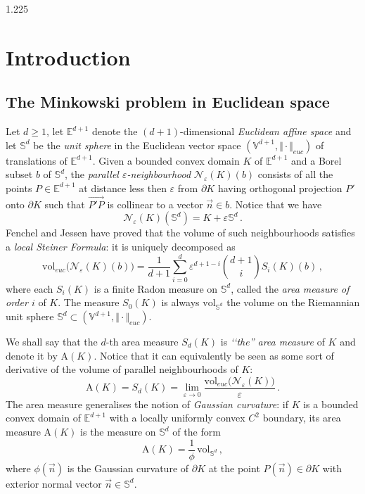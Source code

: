 \documentclass[reqno, a4paper]{amsart}
\numberwithin{equation}{section}
\numberwithin{figure}{section}
\theoremstyle{definition}
\theoremstyle{remark}
\newcommand{\V}{\mathbb{V}} %
\newcommand{\E}{\mathbb{E}} %
\newcommand{\Sph}{\mathbb{S}} %
\newcommand{\vol}{\mathrm{vol}} %
\newcommand{\Area}{\mathrm{A}} %
\newcommand{\bp}[1]{{\bigl( {#1} \bigr)}} %
\begin{document}
\begin{spacing}{1.225}

\section*{Introduction}

\subsection*{The Minkowski problem in Euclidean space}

Let $d \geq 1$, let $\E^{d+1}$ denote the $(d+1)$-dimensional \emph{Euclidean affine space} and let $\Sph^d$ be the \emph{unit sphere} in the Euclidean vector space $(\V^{d+1}, \Vert\cdot\Vert_{euc})$ of translations of $\E^{d+1}$. Given a bounded convex domain $K$ of $\E^{d+1}$ and  a Borel subset $b$ of $\Sph^d$, the \emph{parallel $\varepsilon$-neighbourhood} $\mathcal{N}_\varepsilon(K)(b)$ consists of all the points $P \in \E^{d+1}$ at distance less then $\varepsilon$ from $\partial K$ having orthogonal projection $P'$ onto $\partial K$ such that $\overrightarrow{P'P}$ is collinear to a vector $\vec{n} \in b$. Notice that we have 
\begin{equation*}
\mathcal{N}_\varepsilon(K)(\Sph^{d}) = K +\varepsilon \Sph^{d} \, .
\end{equation*}
Fenchel and Jessen have proved \cite{Fenchel_Jessen_38} that the volume of such neighbourhoods satisfies a \emph{local Steiner Formula}: it is uniquely decomposed as
\begin{equation*}
\vol_{euc}\bp{\mathcal{N}_\varepsilon(K)(b)} = \frac{1}{d+1}\sum_{i=0}^{d}\varepsilon^{d+1-i} \binom{d+1}{i} S_i(K) (b)\, , 
\end{equation*}
where each $S_i(K)$ is a finite Radon measure on $\Sph^d$, called the \emph{area measure of order $i$} of $K$. The measure $S_0(K)$ is always $\vol_{\Sph^d}$ the volume on the Riemannian unit sphere $\Sph^d \subset (\V^{d+1}, \Vert\cdot\Vert_{euc})$.

We shall say that the $d$-th area measure $S_d(K)$ is \emph{‘‘the'' area measure} of $K$ and denote it by $\Area(K)$. Notice that it can equivalently be seen as some sort of derivative of the volume of parallel neighbourhoods of $K$:
\begin{equation*}
    \Area(K) = S_d(K) = \lim_{\varepsilon \to 0} \frac{\vol_{euc}\bp{\mathcal{N}_\varepsilon(K)}}{\varepsilon} \, .
\end{equation*}
The area measure generalises the notion of \emph{Gaussian curvature}: if $K$ is a bounded convex domain of $\E^{d+1}$ with a locally uniformly convex $C^2$ boundary, its area measure $\Area(K)$ is the measure on $\Sph^d$ of the form 
\begin{equation*}
 \Area(K) = \frac{1}{\phi} \, \vol_{\Sph^d} \, ,
\end{equation*}
where $\phi(\vec{n})$ is the Gaussian curvature of $\partial K$ at the point $P(\vec{n}) \in \partial K$ with exterior normal vector $\vec{n} \in \Sph^d$. 


\end{spacing}
\end{document}
